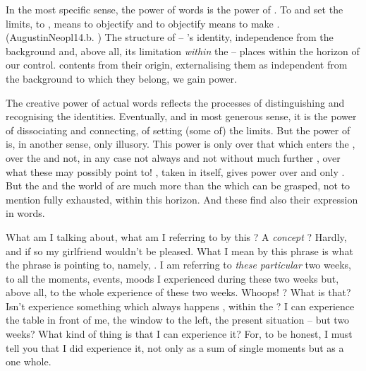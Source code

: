 In the most specific sense, the power of words is the power of .
To  and set the limits, to , means to {objectify}
and to {objectify} means to make . (\citet{To see means: to give
  preliminarily an object as an object. [...] seeing has the meaning of making
  available (of something object-like) in the distinctive sense of pure
  acquainting (with things).}{AugustinNeopl}{\para 14.b. \noo{[p.219]}}) The
structure of  -- 's identity, independence from the
background and, above all, its limitation {\em within} the \hoa -- places
 within the horizon of our control.  contents from
their origin, externalising them as  independent from the background
to which they belong, we gain power.


\pa\label{pa:wordsPowerC} The creative power of actual words reflects the processes of
distinguishing and recognising the identities. Eventually, and in most generous
sense, it is the power of dissociating and connecting, of setting (some of) the
 limits. But the power of  is, in another sense, only
illusory. This power is only over that which enters the \hoa, over the
 and not, in any case not always and not without much further
, over what these  may possibly point to! ,
taken in itself, gives power over  and only .
But the  and the world of
 are much more than the  which can be grasped,
not to mention fully exhausted, within this horizon. And these 
find also their expression in words.



\pa\label{twoweeks}
 What am I talking about,
what am I referring to by this ? A {\em concept} ?
Hardly, and if so my girlfriend wouldn't be pleased. What I mean by
this phrase is what the phrase is pointing to, namely, .  I
am referring to {\em these particular} two weeks, to all the moments, events,
moods I experienced during these two weeks but, above all, to the whole
experience of these two weeks. Whoops! ? What is
that? Isn't experience something which always happens \herenow, within the
\hoa? I can experience the table in front of me, the window to
the left, the present situation -- but two weeks? What kind of thing is  that I can 
experience it? For, to be honest, I must tell you that I did experience it, not
only as a sum of single moments but as a one whole.


